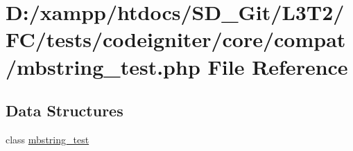 \hypertarget{tests_2codeigniter_2core_2compat_2mbstring__test_8php}{}\section{D\+:/xampp/htdocs/\+S\+D\+\_\+\+Git/\+L3\+T2/\+F\+C/tests/codeigniter/core/compat/mbstring\+\_\+test.php File Reference}
\label{tests_2codeigniter_2core_2compat_2mbstring__test_8php}
\subsection*{Data Structures}
\begin{DoxyCompactItemize}
\item 
class \hyperlink{classmbstring__test}{mbstring\+\_\+test}
\end{DoxyCompactItemize}
